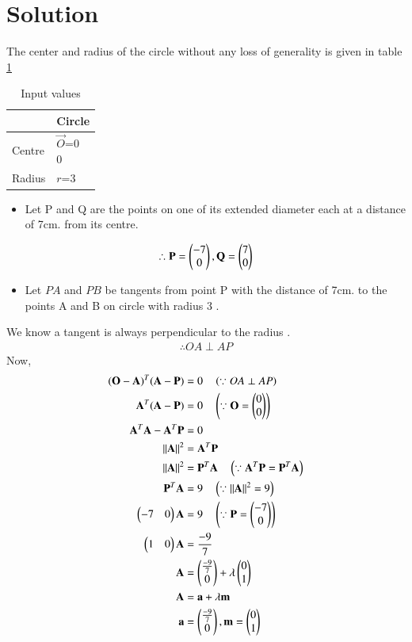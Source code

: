 \documentclass[journal,12pt,twocolumn]{IEEEtran}
\begin{document}
\section{Solution}
The center and radius of the circle without any loss of generality is given in table \ref{tab:table1}
\begin{table}[!ht]
\begin{center}
\begin{tabular}{ | m{2cm} | m{2cm} |} 
\hline
 & Circle \\
\hline
Centre  & $\vec{O}$=\myvec{0\\0} \\ 
\hline
Radius & $r$=3  \\ 
\hline
\end{tabular}
\end{center}
\caption{Input values}
\label{tab:table1}
\end{table}
\begin{itemize}
 \item  Let P and Q are the points on one of its extended diameter each at a distance of 7cm. from its centre.
\end{itemize}
\begin{align}
 \therefore \mathbf{P} = \begin{pmatrix}-7\\0\end{pmatrix},\mathbf{Q} = \begin{pmatrix}7\\0\end{pmatrix}
\end{align}
\begin{itemize}
 \item Let $PA$ and $PB$  be tangents from point P with the distance of 7cm. to the points A and B on circle with radius 3 .
\end{itemize}
  We know a tangent is always perpendicular to the radius .
\begin{align}
\therefore OA \perp AP
\end{align}
Now,
\begin{align}
(\mathbf{O}-\mathbf{A})^T (\mathbf{A}-\mathbf{P}) &= 0 \quad \left(\because OA \perp AP \right)
\\
\mathbf{A}^T(\mathbf{A}-\mathbf{P}) &= 0 \quad \left(\because \mathbf{O}=\begin{pmatrix}0\\0\end{pmatrix}\right)
\\
\mathbf{A}^T \mathbf{A} - \mathbf{A}^T \mathbf{P} &= 0  
\\
\left\lVert\mathbf{A}\right\rVert^2 &= \mathbf{A}^T \mathbf{P}
\\
\left\lVert\mathbf{A}\right\rVert^2 &= \mathbf{P}^T \mathbf{A}  \quad \left(\because \mathbf{A}^T \mathbf{P} = \mathbf{P}^T \mathbf{A}\right)
\\
\mathbf{P}^T \mathbf{A} &= 9 \quad \left(\because \left\lVert\mathbf{A}\right\rVert^2 = 9\right)
\\
\begin{pmatrix}-7&0\end{pmatrix} \mathbf{A} &= 9 \quad \left(\because \mathbf{P} = \begin{pmatrix}-7\\0\end{pmatrix} \right)
\\
\begin{pmatrix}1&0\end{pmatrix} \mathbf{A} &= \frac{-9}{7}
\\
\mathbf{A} &= \begin{pmatrix}\frac{-9}{7}\\0\end{pmatrix} + \lambda \begin{pmatrix}0\\1\end{pmatrix} \label{2.0.11} 
\\
\mathbf{A}&=\mathbf{a}+\lambda\mathbf{m} 
\\
\mathbf{a}&=\begin{pmatrix}\frac{-9}{7}\\ 0\end{pmatrix},\mathbf{m}=\begin{pmatrix}0\\1\end{pmatrix}
\end{align}
\end{document}
